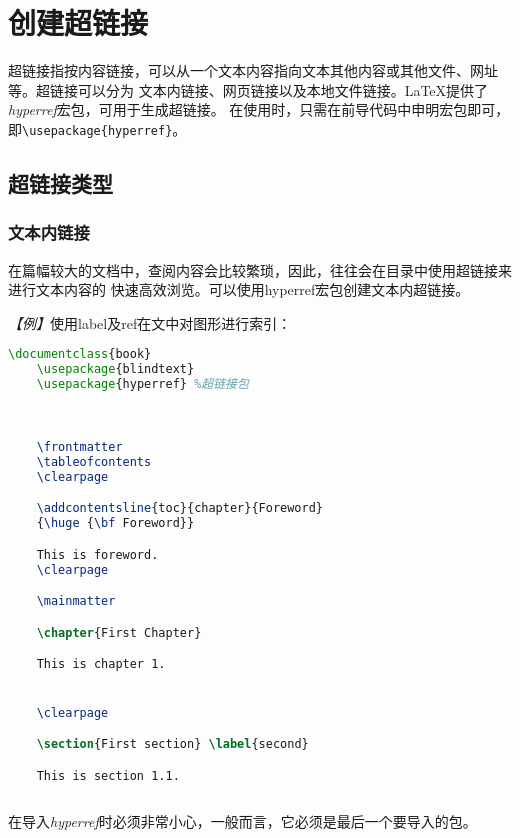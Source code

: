 \section{创建超链接}

超链接指按内容链接，可以从一个文本内容指向文本其他内容或其他文件、网址等。超链接可以分为
文本内链接、网页链接以及本地文件链接。LaTeX提供了\emph{hyperref}宏包，可用于生成超链接。
在使用时，只需在前导代码中申明宏包即可，即\texttt{\textbackslash{}usepackage\{hyperref\}}。

\subsection{超链接类型}

\subsubsection{文本内链接}

在篇幅较大的文档中，查阅内容会比较繁琐，因此，往往会在目录中使用超链接来进行文本内容的
快速高效浏览。可以使用hyperref宏包创建文本内超链接。

\emph{【例】}使用label及ref在文中对图形进行索引：
\begin{lstlisting}[language=TeX]
    \documentclass{book}
    \usepackage{blindtext}
    \usepackage{hyperref} %超链接包

    

    \frontmatter
    \tableofcontents
    \clearpage

    \addcontentsline{toc}{chapter}{Foreword}
    {\huge {\bf Foreword}}

    This is foreword.
    \clearpage

    \mainmatter

    \chapter{First Chapter}

    This is chapter 1.


    \clearpage

    \section{First section} \label{second}

    This is section 1.1.
    
\end{lstlisting}

在导入\emph{hyperref}时必须非常小心，一般而言，它必须是最后一个要导入的包。

